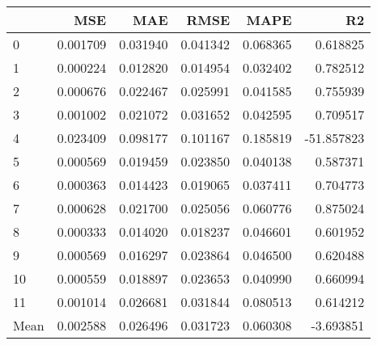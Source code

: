 \begin{tabular}{lrrrrr}
\toprule
 & MSE & MAE & RMSE & MAPE & R2 \\
\midrule
0 & 0.001709 & 0.031940 & 0.041342 & 0.068365 & 0.618825 \\
1 & 0.000224 & 0.012820 & 0.014954 & 0.032402 & 0.782512 \\
2 & 0.000676 & 0.022467 & 0.025991 & 0.041585 & 0.755939 \\
3 & 0.001002 & 0.021072 & 0.031652 & 0.042595 & 0.709517 \\
4 & 0.023409 & 0.098177 & 0.101167 & 0.185819 & -51.857823 \\
5 & 0.000569 & 0.019459 & 0.023850 & 0.040138 & 0.587371 \\
6 & 0.000363 & 0.014423 & 0.019065 & 0.037411 & 0.704773 \\
7 & 0.000628 & 0.021700 & 0.025056 & 0.060776 & 0.875024 \\
8 & 0.000333 & 0.014020 & 0.018237 & 0.046601 & 0.601952 \\
9 & 0.000569 & 0.016297 & 0.023864 & 0.046500 & 0.620488 \\
10 & 0.000559 & 0.018897 & 0.023653 & 0.040990 & 0.660994 \\
11 & 0.001014 & 0.026681 & 0.031844 & 0.080513 & 0.614212 \\
Mean & 0.002588 & 0.026496 & 0.031723 & 0.060308 & -3.693851 \\
\bottomrule
\end{tabular}

